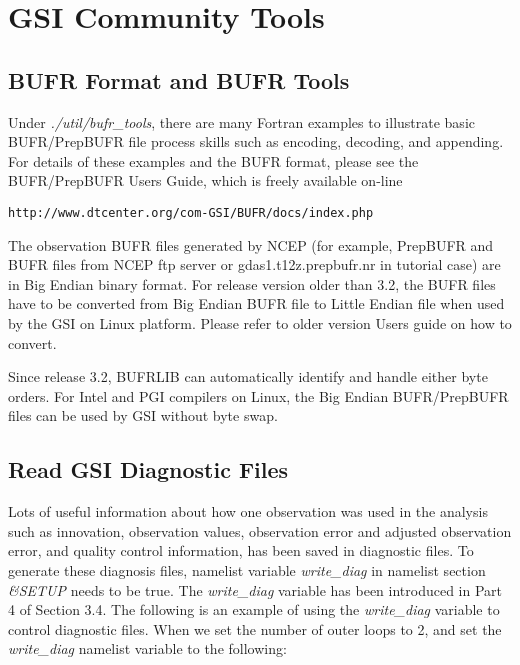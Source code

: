 \chapter{GSI Community Tools}
 
\section{BUFR Format and BUFR Tools}

Under \textit{./util/bufr\_tools}, there are many Fortran examples to illustrate basic BUFR/PrepBUFR file process skills such as encoding, decoding, and appending. For details of these examples and the BUFR format, please see the BUFR/PrepBUFR User\textquotesingle s Guide, which is freely available on-line
\begin{scriptsize}
\begin{verbatim}
http://www.dtcenter.org/com-GSI/BUFR/docs/index.php
\end{verbatim}
\end{scriptsize}
The observation BUFR files generated by NCEP (for example, PrepBUFR and BUFR files from NCEP ftp server or gdas1.t12z.prepbufr.nr in tutorial case) are in Big Endian binary format. For release version older than 3.2, the BUFR files have to be converted from  Big Endian BUFR file to Little Endian file when used by the GSI on Linux platform. Please refer to older version User\textquotesingle s guide on how to convert.

Since release 3.2, BUFRLIB can automatically identify and handle either byte orders. For Intel and PGI compilers on Linux, the Big Endian BUFR/PrepBUFR files can be used by GSI without byte swap.

\section{Read GSI Diagnostic Files}

Lots of useful information about how one observation was used in the analysis such as innovation, observation values, observation error and adjusted observation error, and quality control information, has been saved in diagnostic files. To generate these diagnosis files, namelist variable \textit{write\_diag} in namelist section \textit{\&SETUP} needs to be true. The \textit{write\_diag} variable has been introduced in Part 4 of Section 3.4. The following is an example of using the \textit{write\_diag} variable to control diagnostic files. When we set the number of outer loops to 2, and set the \textit{write\_diag} namelist variable to the following:

